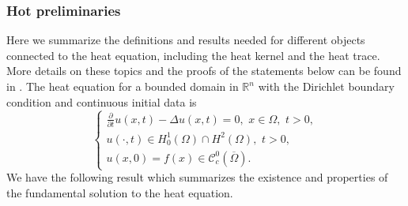 \documentclass{amsart}
\theoremstyle{definition}
\newcommand*{\R}{\mathbb{R}}
\begin{document}
\subsubsection{Hot preliminaries} \label{sec:heatkernel}
Here we summarize the definitions and results needed for %
different objects connected to the heat equation, including the heat kernel and the heat trace. %
More details on these topics and the proofs of the statements below can be found in \cite%
{albin2017linear}. The heat equation for a bounded domain in $\R^n$ with the Dirichlet boundary condition and continuous initial data is 
\begin{equation} \label{eq:heat}
        \begin{cases}
            \frac{\partial }{\partial t}u(x,t) - \Delta u(x, t) = 0, \,\, x \in \Omega, \,\, t > 0, \\
            u(\cdot,t) \in H_0^1(\Omega) \cap H^2(\Omega), \,\, t > 0, \\
            u(x,0) = f(x) \in \mathscr{C}_c^0(\overline{\Omega}).
        \end{cases}
\end{equation}
We have the following result which summarizes the existence and properties of the fundamental solution to the heat equation.  
\end{document}

